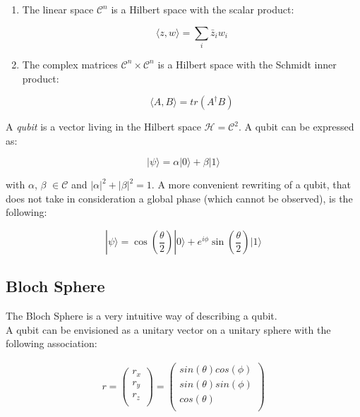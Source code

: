\begin{enumerate}
    \item The linear space $\mathcal{C}^n$ is a Hilbert space with the scalar product:

\begin{equation}
    \langle z , w \rangle = \sum_i \bar{z}_i w_i
\end{equation}

    \item The complex matrices $\mathcal{C}^n \times \mathcal{C}^n$ is a Hilbert space with the Schmidt inner product:

\begin{equation}
    \langle A , B \rangle = tr(A^{\dagger}B)
\end{equation}

\end{enumerate}

A \textit{qubit} is a vector living in the Hilbert space $\mathcal{H} = \mathcal{C}^2$.
A qubit can be expressed as:

\begin{equation}
    |\psi \rangle = \alpha |0 \rangle +  \beta |1 \rangle
\end{equation}

with $\alpha$, $\beta$ $\in \mathcal{C}$ and $|\alpha|^2 + |\beta|^2 = 1$.
A more convenient rewriting of a qubit, that does not take in consideration a global phase (which cannot be observed), is the following:

\begin{equation}
    |\psi \rangle = \cos(\frac{\theta}{2}) |0 \rangle +  e^{i \phi} \sin(\frac{\theta}{2}) |1 \rangle
\end{equation}


\subsection{Bloch Sphere}

The Bloch Sphere is a very intuitive way of describing a qubit.\\
A qubit can be envisioned as a unitary vector on a unitary sphere with the following association:

\begin{align}
    r = 
    \begin{pmatrix}
        r_x \\
        r_y \\
        r_z \\
    \end{pmatrix}
    = 
    \begin{pmatrix}
        sin(\theta)cos(\phi) \\
        sin(\theta)sin(\phi) \\
        cos(\theta) \\
    \end{pmatrix}
\end{align}

